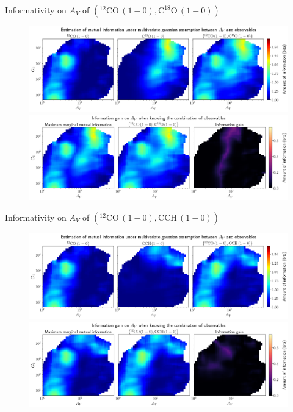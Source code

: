 \documentclass{beamer}
\begin{document}
\begin{frame}{Informativity on $A_V$ of $\left(\mathrm{^{12}CO\,(1-0)},\mathrm{C^{18}O\,(1-0)}\right)$}
    \begin{figure}
        \centering
        \includegraphics[width=0.95\linewidth]{../linearinfo/av__12co10_c18o10_linearinfo.png}
        \vfill
        \includegraphics[width=0.95\linewidth]{../linearinfo/av__12co10_c18o10_linearinfo_gain.png}
    \end{figure}
\end{frame}

\begin{frame}{Informativity on $A_V$ of $\left(\mathrm{^{12}CO\,(1-0)},\mathrm{CCH\,(1-0)}\right)$}
    \begin{figure}
        \centering
        \includegraphics[width=0.95\linewidth]{../linearinfo/av__12co10_cch10_linearinfo.png}
        \vfill
        \includegraphics[width=0.95\linewidth]{../linearinfo/av__12co10_cch10_linearinfo_gain.png}
    \end{figure}
\end{frame}
\end{document}
